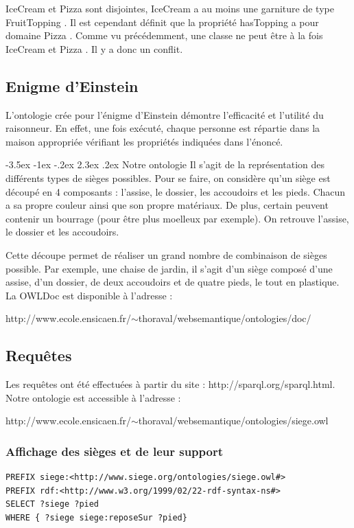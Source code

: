 \documentclass[a4paper,12pt]{article}
\makeatletter
\renewcommand\section{\@startsection {section}{1}{\z@}%
                           {-3.5ex \@plus -1ex \@minus -.2ex}%
                           {2.3ex \@plus.2ex}%
                           {\normalfont\Large\bfseries}}
\makeatother
\begin{document}
\og IceCream \fg{}  et \og Pizza \fg{} sont disjointes, \og IceCream \fg{} a au moins une garniture de type \og FruitTopping \fg{}. Il est cependant définit que la propriété \og hasTopping \fg{} a pour domaine \og Pizza \fg{}. Comme vu précédemment, une classe ne peut être à la fois \og IceCream \fg{} et \og Pizza \fg{}. Il y a donc un conflit.


\subsection{Enigme d'Einstein}
L'ontologie crée pour l'énigme d'Einstein démontre l'efficacité et l'utilité du raisonneur. En effet, une fois exécuté, chaque personne est répartie dans la maison appropriée vérifiant les propriétés indiquées dans l'énoncé.

\section{Notre ontologie}
Il s'agit de la représentation des différents types de sièges possibles.
Pour se faire, on considère qu'un siège est découpé en 4 composants : l'assise, le dossier, les accoudoirs et les pieds.
Chacun a sa propre couleur ainsi que son propre matériaux.
De plus, certain peuvent contenir un bourrage (pour être plus moelleux par exemple). On retrouve l'assise, le dossier et les accoudoirs. 

Cette découpe permet de réaliser un grand nombre de combinaison de sièges possible.
Par exemple, une chaise de jardin, il s'agit d'un siège composé d'une assise, d'un dossier, de deux accoudoirs et de quatre pieds, le tout en plastique.\\
La OWLDoc est disponible à l'adresse :
\begin{center}
http://www.ecole.ensicaen.fr/$\sim$thoraval/websemantique/ontologies/doc/
\end{center}

\subsection{Requêtes}
Les requêtes ont été effectuées à partir du site : http://sparql.org/sparql.html.
Notre ontologie est accessible à l'adresse :
\begin{center}
http://www.ecole.ensicaen.fr/$\sim$thoraval/websemantique/ontologies/siege.owl
\end{center}

\subsubsection{Affichage des sièges et de leur support}
\lstset{commentstyle=\textit}
\begin{lstlisting}
PREFIX siege:<http://www.siege.org/ontologies/siege.owl#>
PREFIX rdf:<http://www.w3.org/1999/02/22-rdf-syntax-ns#>
SELECT ?siege ?pied
WHERE { ?siege siege:reposeSur ?pied}
\end{lstlisting}
\end{document}
